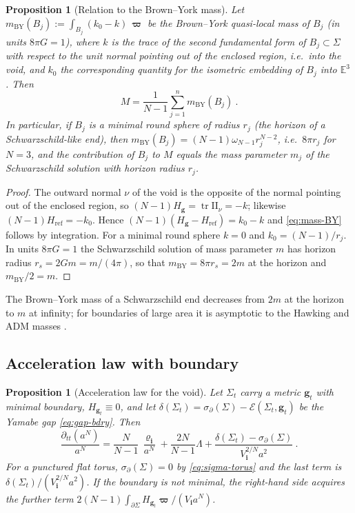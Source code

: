 \documentclass[aps,prd,reprint,amsmath,amssymb,nofootinbib,longbibliography]{revtex4-2}
\DeclareMathOperator{\tr}{tr}
\newcommand{\Eucl}{\mathbb{E}}
\newcommand{\g}{\mathbf{g}}                 %
\newcommand{\bvol}{\boldsymbol{\varpi}}     %
\newcommand{\sigbd}{\sigma_\partial}       %
\newcommand{\ini}[1]{{#1}_{\mathbf{i}}}     %
\newcommand{\inirho}{\ini{\varrho}}
\newcommand{\mBY}{m_{\mathrm{BY}}}
\newcommand{\Href}{H_{\mathrm{ref}}}
\newcommand{\EH}{\mathcal{E}}               %
\theoremstyle{plain}
\newtheorem{proposition}[theorem]{Proposition}
\theoremstyle{definition}
\theoremstyle{remark}
\begin{document}
\begin{proposition}[Relation to the Brown--York mass]
\label{prop:brown-york}
Let $\mBY(B_j):=\int_{B_j}(k_0-k)\,\bvol$ be the Brown--York quasi-local mass of $B_j$ \cite{MR1188439,BrownYork1993} (in units $8\pi G=1$), where $k$ is the trace of the second fundamental form of $B_j\subset\Sigma$ with respect to the unit normal pointing out of the enclosed region, i.e.\ into the void, and $k_0$ the corresponding quantity for the isometric embedding of $B_j$ into $\Eucl^3$. Then
\begin{equation}
\label{eq:mass-BY}
M=\frac{1}{N-1}\sum_{j=1}^n\mBY(B_j)\ .
\end{equation}
In particular, if $B_j$ is a minimal round sphere of radius $r_j$ (the horizon of a Schwarzschild-like end), then $\mBY(B_j)=(N-1)\omega_{N-1}r_j^{N-2}$, i.e.\ $8\pi r_j$ for $N=3$, and the contribution of $B_j$ to $M$ equals the mass parameter $m_j$ of the Schwarzschild solution with horizon radius $r_j$.
\end{proposition}
\begin{proof}
The outward normal $\nu$ of the void is the opposite of the normal pointing out of the enclosed region, so $(N-1)H_\g=\tr\mathrm{II}_\nu=-k$; likewise $(N-1)\Href=-k_0$. Hence $(N-1)(H_\g-\Href)=k_0-k$ and \eqref{eq:mass-BY} follows by integration. For a minimal round sphere $k=0$ and $k_0=(N-1)/r_j$. In units $8\pi G=1$ the Schwarzschild solution of mass parameter $m$ has horizon radius $r_s=2Gm=m/(4\pi)$, so that $\mBY=8\pi r_s=2m$ at the horizon and $\mBY/2=m$.
\end{proof}

The Brown--York mass of a Schwarzschild end decreases from $2m$ at the horizon to $m$ at infinity; for boundaries of large area it is asymptotic to the Hawking \cite{MR3960907} and ADM \cite{2008GReGr..40.1997A} masses \cite{MR1916951,MR2562923}.

\subsection{Acceleration law with boundary}

\begin{proposition}[Acceleration law for the void]
\label{prop:accel-bdry}
Let $\Sigma_t$ carry a metric $\g_t$ with minimal boundary, $H_{\g_t}\equiv0$, and let $\delta(\Sigma_t)=\sigbd(\Sigma)-\EH(\Sigma_t,\g_t)$ be the Yamabe gap \eqref{eq:gap-bdry}. Then
\begin{equation}
\label{eq:accel-bdry}
\frac{\partial_{tt} (a^N)}{a^N} = \frac{N}{N-1}\, \frac{\inirho}{a^N} + \frac{2N}{N-1}\Lambda + \frac{\delta(\Sigma_t)-\sigbd(\Sigma)}{\ini V^{2/N}a^2}\ .
\end{equation}
For a punctured flat torus, $\sigbd(\Sigma)=0$ by \eqref{eq:sigma-torus} and the last term is $\delta(\Sigma_t)/(\ini V^{2/N}a^2)$. If the boundary is not minimal, the right-hand side acquires the further term $2(N-1)\int_{\partial\Sigma}H_{\g_t}\bvol/(\ini V a^N)$.
\end{proposition}
\end{document}
